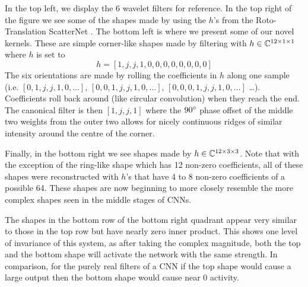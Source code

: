 In the top left, we display the 6 wavelet filters for reference. In the top
right of the figure we see some
of the shapes made by using the $h$'s from the Roto-Translation ScatterNet
\cite{sifre_rotation_2013, oyallon_deep_2015}.  The bottom left is where we
present some of our novel kernels. These are simple corner-like shapes made
by filtering with ${h\in \complexes[12\x 1\x 1]}$ where $h$ is set to
\begin{equation} \label{eq:ch4:simple_corner}
  h = [1, j, j, 1, 0, 0, 0, 0, 0, 0, 0, 0]
\end{equation}
The six orientations are made by rolling the coefficients in $h$ along one
sample (i.e. $[0, 1, j, j, 1, 0,\ldots]$, $[0,0,1,j,j,1,0,\ldots]$,
$[0,0,0,1,j,j,1,0, \ldots]$ \ldots). Coefficients roll back around (like
circular convolution) when they reach the end. The canonical filter is then $[1,
j, j, 1]$ where the $90\degs$ phase offset of the middle two weights from the
outer two allows for nicely continuous ridges of similar intensity around the
centre of the corner.

Finally, in the bottom right we see shapes made by
${h \in \complexes[12\x 3\x 3]}$. Note that with the exception of the
ring-like shape which has 12 non-zero coefficients, all of these shapes were
reconstructed with $h$'s that have 4 to 8 non-zero coefficients of a possible
64. These shapes are now beginning to more closely resemble the more complex
shapes seen in the middle stages of CNNs.

The shapes in the bottom row of the bottom right quadrant appear very similar to
those in the top row but have nearly zero inner product. This shows one level of
invariance of this system, as after taking the complex magnitude, both the top
and the bottom shape will activate the network with the same strength. In
comparison, for the purely real filters of a CNN if the top shape would cause a
large output then the bottom shape would cause near 0 activity.

